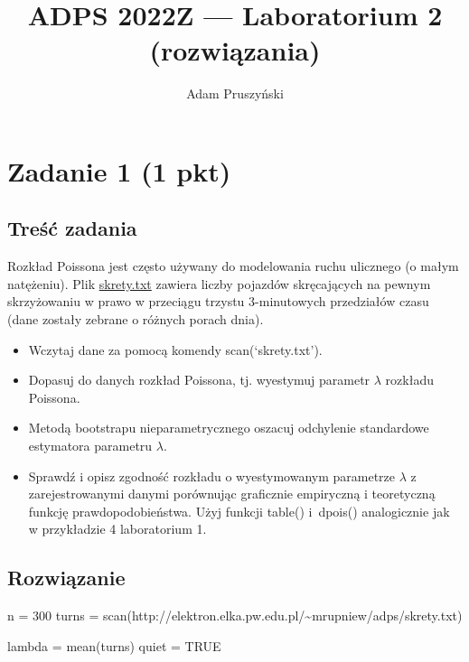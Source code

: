 \documentclass[
]{article}
\title{ADPS 2022Z --- Laboratorium 2 (rozwiązania)}
\author{Adam Pruszyński}
\date{}
\newenvironment{Shaded}{\begin{snugshade}}{\end{snugshade}}
\newcommand{\ConstantTok}[1]{\textcolor[rgb]{0.00,0.00,0.00}{#1}}
\newcommand{\DecValTok}[1]{\textcolor[rgb]{0.00,0.00,0.81}{#1}}
\newcommand{\FunctionTok}[1]{\textcolor[rgb]{0.00,0.00,0.00}{#1}}
\newcommand{\NormalTok}[1]{#1}
\newcommand{\OtherTok}[1]{\textcolor[rgb]{0.56,0.35,0.01}{#1}}
\newcommand{\StringTok}[1]{\textcolor[rgb]{0.31,0.60,0.02}{#1}}
\begin{document}
\maketitle

\hypertarget{zadanie-1-1-pkt}{%
\section{Zadanie 1 (1 pkt)}\label{zadanie-1-1-pkt}}

\hypertarget{treux15bux107-zadania}{%
\subsection{Treść zadania}\label{treux15bux107-zadania}}

Rozkład Poissona jest często używany do modelowania ruchu ulicznego (o
małym natężeniu). Plik
\href{http://elektron.elka.pw.edu.pl/~mrupniew/adps/skrety.txt}{skrety.txt}
zawiera liczby pojazdów skręcających na pewnym skrzyżowaniu w prawo w
przeciągu trzystu 3-minutowych przedziałów czasu (dane zostały zebrane o
różnych porach dnia).

\begin{itemize}
\item
  Wczytaj dane za pomocą komendy scan(`skrety.txt').
\item
  Dopasuj do danych rozkład Poissona, tj. wyestymuj parametr \(\lambda\)
  rozkładu Poissona.
\item
  Metodą bootstrapu nieparametrycznego oszacuj odchylenie standardowe
  estymatora parametru \(\lambda\).
\item
  Sprawdź i opisz zgodność rozkładu o wyestymowanym parametrze
  \(\lambda\) z zarejestrowanymi danymi porównując graficznie empiryczną
  i teoretyczną funkcję prawdopodobieństwa. Użyj funkcji table()
  i~dpois() analogicznie jak w przykładzie 4 laboratorium 1.
\end{itemize}

\hypertarget{rozwiux105zanie}{%
\subsection{Rozwiązanie}\label{rozwiux105zanie}}

\begin{Shaded}
\begin{Highlighting}[]
\NormalTok{n }\OtherTok{=} \DecValTok{300}
\NormalTok{turns }\OtherTok{=} \FunctionTok{scan}\NormalTok{(}\StringTok{\textquotesingle{}http://elektron.elka.pw.edu.pl/\textasciitilde{}mrupniew/adps/skrety.txt\textquotesingle{}}\NormalTok{)}

\NormalTok{lambda }\OtherTok{=} \FunctionTok{mean}\NormalTok{(turns)}
\NormalTok{quiet }\OtherTok{=} \ConstantTok{TRUE} 
\end{Highlighting}
\end{Shaded}
\end{document}
